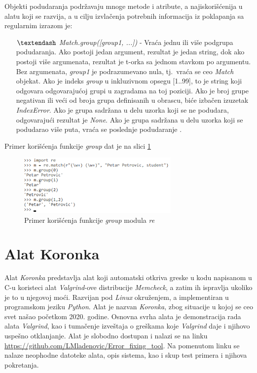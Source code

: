 \documentclass[12pt,oneside]{memoir}
\theoremstyle{plain}
\theoremstyle{definition}
\begin{document}
Objekti podudaranja podržavaju mnoge metode i atribute, a najiskorišćenija u alatu koji se razvija, a u cilju izvlačenja potrebnih informacija iz poklapanja sa regularnim izrazom je:
\begin{itemize}
\item[$\textendash$]  \textit{Match.group([group1, ...])} - Vraća jednu ili više podgrupa podudaranja. Ako postoji jedan argument, rezultat je jedan string, dok ako postoji više argumenata, rezultat je t-orka sa jednom stavkom po argumentu. Bez argumenata, \textit{group1} je  podrazumevano nula, tj.~vraća se ceo \textit{Match} objekat. Ako je indeks \textit{group} u inkluzivnom opsegu [1..99], to je string koji odgovara odgovarajućoj grupi u zagradama na toj poziciji. Ako je broj grupe negativan ili veći od broja grupa definisanih u obrascu, biće izbačen izuzetak \textit{IndexError}. Ako je grupa sadržana u delu uzorka koji se ne podudara, odgovarajući rezultat je \textit{None}. Ako je grupa sadržana u delu uzorka koji se podudarao više puta, vraća se poslednje podudaranje \cite{reModule}.
\end{itemize}

Primer korišćenja funkcije \textit{group} dat je na slici \ref{fig:slika3.1}
\begin{figure}[!ht]
  \centering
  \includegraphics[width=0.7\textwidth]{reModule.png}
  \caption{Primer korišćenja funkcije \textit{group} modula \textit{re}}
  \label{fig:slika3.1}
\end{figure}


\chapter{Alat Koronka}
Alat \textit{Koronka} predstavlja alat koji automatski otkriva greske u kodu napisanom u C-u koristeci alat \textit{Valgrind}-ove distribucije \textit{Memcheck}, a zatim ih ispravlja ukoliko je to u njegovoj moći. Razvijan pod \textit{Linux} okruženjem, a implementiran u programskom jeziku \textit{Python}. Alat je nazvan \textit{Koronka}, zbog situacije u kojoj se ceo svet našao početkom 2020. godine. Osnovna svrha alata je demonstracija rada alata \textit{Valgrind}, kao i tumačenje izveštaja o greškama koje \textit{Valgrind} daje i njihovo uspešno otklanjanje. Alat je slobodno dostupan i nalazi se na linku \url{https://github.com/LMladenovic/Error_fixing_tool}. Na pomenutom linku se nalaze neophodne datoteke alata, opis sistema, kao i skup test primera i njihova pokretanja.
\end{document}
